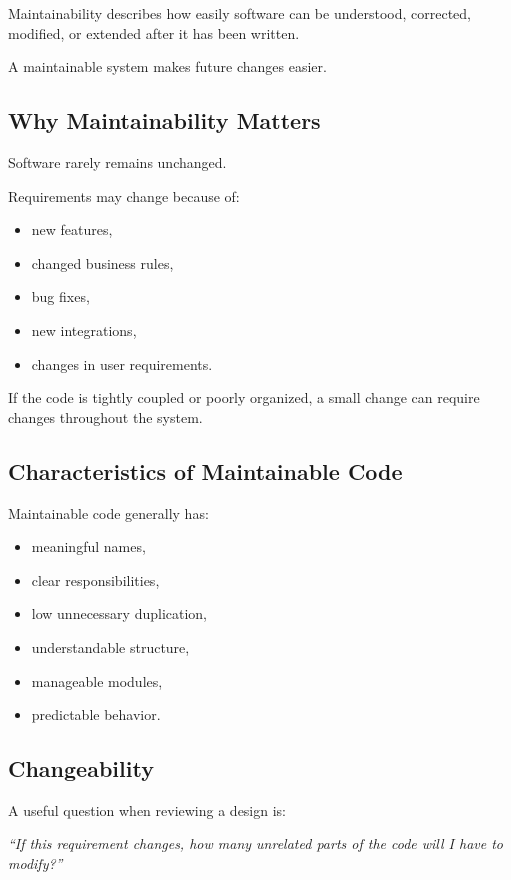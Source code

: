 \documentclass[11pt,a4paper]{article}
\begin{document}
Maintainability describes how easily software can be understood, corrected,
modified, or extended after it has been written.

A maintainable system makes future changes easier.

\subsection{Why Maintainability Matters}

Software rarely remains unchanged.

Requirements may change because of:

\begin{itemize}
    \item new features,
    \item changed business rules,
    \item bug fixes,
    \item new integrations,
    \item changes in user requirements.
\end{itemize}

If the code is tightly coupled or poorly organized, a small change can require
changes throughout the system.

\subsection{Characteristics of Maintainable Code}

Maintainable code generally has:

\begin{itemize}
    \item meaningful names,
    \item clear responsibilities,
    \item low unnecessary duplication,
    \item understandable structure,
    \item manageable modules,
    \item predictable behavior.
\end{itemize}

\subsection{Changeability}

A useful question when reviewing a design is:

\begin{center}
\textit{``If this requirement changes, how many unrelated parts of the code
will I have to modify?''}
\end{center}
\end{document}
